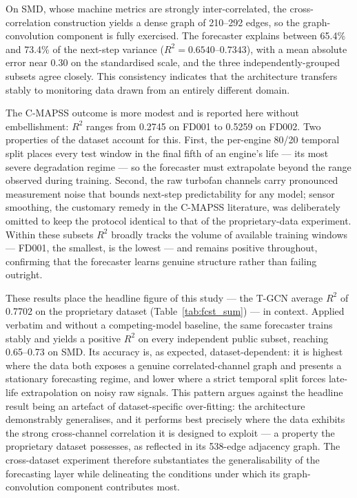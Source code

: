 On SMD, whose machine metrics are strongly inter-correlated, the
cross-correlation construction yields a dense graph of 210--292 edges, so the
graph-convolution component is fully exercised. The forecaster explains
between 65.4\% and 73.4\% of the next-step variance ($R^2 = 0.6540$--$0.7343$),
with a mean absolute error near 0.30 on the standardised scale, and the three
independently-grouped subsets agree closely. This consistency indicates that
the architecture transfers stably to monitoring data drawn from an entirely
different domain.

The C-MAPSS outcome is more modest and is reported here without embellishment:
$R^2$ ranges from 0.2745 on FD001 to 0.5259 on FD002. Two properties of the
dataset account for this. First, the per-engine 80/20 temporal split places
every test window in the final fifth of an engine's life --- its most severe
degradation regime --- so the forecaster must extrapolate beyond the range
observed during training. Second, the raw turbofan channels carry pronounced
measurement noise that bounds next-step predictability for any model; sensor
smoothing, the customary remedy in the C-MAPSS literature, was deliberately
omitted to keep the protocol identical to that of the proprietary-data
experiment. Within these subsets $R^2$ broadly tracks the volume of available
training windows --- FD001, the smallest, is the lowest --- and remains
positive throughout, confirming that the forecaster learns genuine structure
rather than failing outright.

These results place the headline figure of this study --- the T-GCN average
$R^2$ of 0.7702 on the proprietary dataset (Table~\ref{tab:fcst_sum}) --- in
context. Applied verbatim and without a competing-model baseline, the same
forecaster trains stably and yields a positive $R^2$ on every independent
public subset, reaching 0.65--0.73 on SMD. Its accuracy is, as expected,
dataset-dependent: it is highest where the data both exposes a genuine
correlated-channel graph and presents a stationary forecasting regime, and
lower where a strict temporal split forces late-life extrapolation on noisy
raw signals. This pattern argues against the headline result being an artefact
of dataset-specific over-fitting: the architecture demonstrably generalises,
and it performs best precisely where the data exhibits the strong cross-channel
correlation it is designed to exploit --- a property the proprietary dataset
possesses, as reflected in its 538-edge adjacency graph. The cross-dataset
experiment therefore substantiates the generalisability of the forecasting
layer while delineating the conditions under which its graph-convolution
component contributes most.

